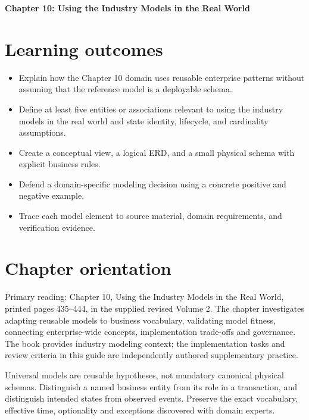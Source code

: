 \documentclass[11pt,letterpaper]{article}
\begin{document}
\begin{center}
{\LARGE\bfseries\color{navy} Chapter 10: Using the Industry Models in the Real World}\par
\vspace{0.25em}{\large Study guide | concept, critique, design, verify}\par
{}
\end{center}
\vspace{0.8em}
\section{Learning outcomes}
\begin{itemize}
\item Explain how the Chapter 10 domain uses reusable enterprise patterns without assuming that the reference model is a deployable schema.
\item Define at least five entities or associations relevant to using the industry models in the real world and state identity, lifecycle, and cardinality assumptions.
\item Create a conceptual view, a logical ERD, and a small physical schema with explicit business rules.
\item Defend a domain-specific modeling decision using a concrete positive and negative example.
\item Trace each model element to source material, domain requirements, and verification evidence.
\end{itemize}

\section{Chapter orientation}
Primary reading: Chapter 10, Using the Industry Models in the Real World, printed pages 435--444, in the supplied revised Volume 2. The chapter investigates adapting reusable models to business vocabulary, validating model fitness, connecting enterprise-wide concepts, implementation trade-offs and governance. The book provides industry modeling context; the implementation tasks and review criteria in this guide are independently authored supplementary practice.

Universal models are reusable hypotheses, not mandatory canonical physical schemas. Distinguish a named business entity from its role in a transaction, and distinguish intended states from observed events. Preserve the exact vocabulary, effective time, optionality and exceptions discovered with domain experts.
\end{document}
